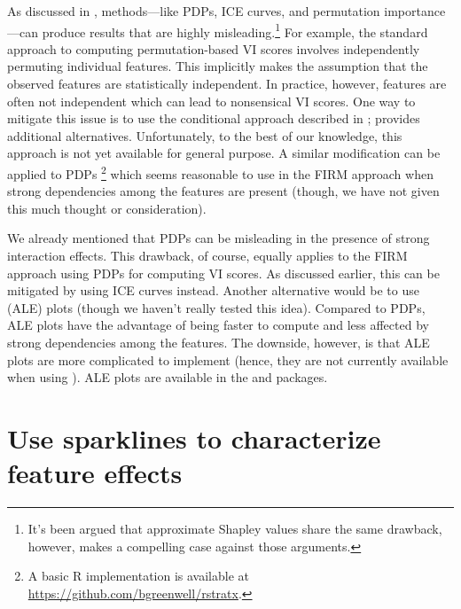 As discussed in \citet{hooker-2019-stop}, 
methods---like PDPs, ICE curves, and permutation importance---can
produce results that are highly misleading.\footnote{It's been argued
  that approximate Shapley values share the same drawback, however,
  \citet{janzing-2019-feature} makes a compelling case against those
  arguments.} For example, the standard approach to computing
permutation-based VI scores involves independently permuting individual
features. This implicitly makes the assumption that the observed
features are statistically independent. In practice, however, features
are often not independent which can lead to nonsensical VI scores. One
way to mitigate this issue is to use the conditional approach described
in \citet{strobl-2019-conditional}; \citet{hooker-2019-stop} provides
additional alternatives. Unfortunately, to the best of our knowledge,
this approach is not yet available for general purpose. A similar
modification can be applied to PDPs
\citep{parr-2019-technical}\footnote{A basic R implementation is
  available at \url{https://github.com/bgreenwell/rstratx}.} which seems
reasonable to use in the FIRM approach when strong dependencies among
the features are present (though, we have not given this much thought or
consideration).

We already mentioned that PDPs can be misleading in the presence of
strong interaction effects. This drawback, of course, equally applies to
the FIRM approach using PDPs for computing VI scores. As discussed
earlier, this can be mitigated by using ICE curves instead. Another
alternative would be to use  (ALE) plots
\citep{apley-2016-visualizing} (though we haven't really tested this
idea). Compared to PDPs, ALE plots have the advantage of being faster to
compute and less affected by strong dependencies among the features. The
downside, however, is that ALE plots are more complicated to implement
(hence, they are not currently available when using
). ALE plots are available in the
 \citep{R-ALEPlot} and  packages.

\section{Use sparklines to characterize feature effects}


